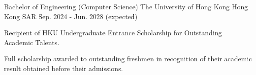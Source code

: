 

\begin{cventries}

  \cventry
    {Bachelor of Engineering (Computer Science)} %
    {The University of Hong Kong} %
    {Hong Kong SAR} %
    {Sep. 2024 - Jun. 2028 (expected)} %
    {
      \begin{cvitems} %
        \item {Recipient of HKU Undergraduate Entrance Scholarship for Outstanding Academic Talents.}
        \item {Full scholarship awarded to outstanding freshmen in recognition of their academic result obtained before their
admissions.}
      \end{cvitems}
    }

\end{cventries}
